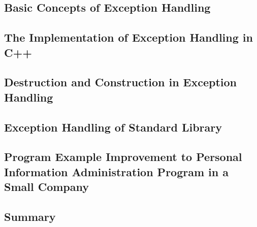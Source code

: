 \documentclass[a4paper]{article}
\begin{document}
\subsection{Basic Concepts of Exception Handling}

\subsection{The Implementation of Exception Handling in C++}

\subsection{Destruction and Construction in Exception Handling}

\subsection{Exception Handling of Standard Library}

\subsection{Program Example Improvement to Personal Information Administration Program in a Small Company}

\subsection{Summary}
\end{document}
